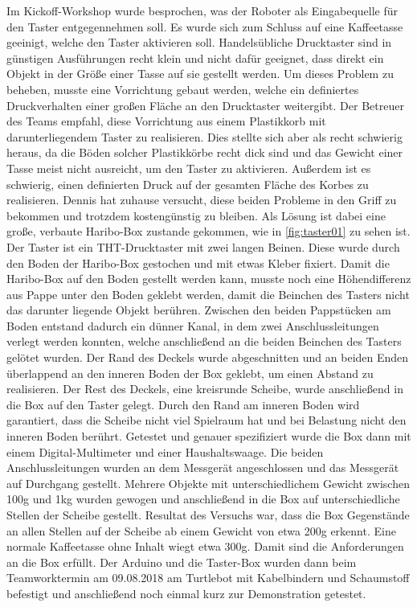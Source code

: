 \documentclass[a4paper,12pt,headsepline]{scrartcl}
\begin{document}
Im Kickoff-Workshop wurde besprochen, was der Roboter als Eingabequelle für den Taster entgegennehmen soll. Es wurde sich zum Schluss auf eine Kaffeetasse geeinigt, welche den Taster aktivieren soll. Handelsübliche Drucktaster sind in günstigen Ausführungen recht klein und nicht dafür geeignet, dass direkt ein Objekt in der Größe einer Tasse auf sie gestellt werden. Um dieses Problem zu beheben, musste eine Vorrichtung gebaut werden, welche ein definiertes Druckverhalten einer großen Fläche an den Drucktaster weitergibt. Der Betreuer des Teams empfahl, diese Vorrichtung aus einem Plastikkorb mit darunterliegendem Taster zu realisieren. Dies stellte sich aber als recht schwierig heraus, da die Böden solcher Plastikkörbe recht dick sind und das Gewicht einer Tasse meist nicht ausreicht, um den Taster zu aktivieren. Außerdem ist es schwierig, einen definierten Druck auf der gesamten Fläche des Korbes zu realisieren. Dennis hat zuhause versucht, diese beiden Probleme in den Griff zu bekommen und trotzdem kostengünstig zu bleiben. Als Lösung ist dabei eine große, verbaute Haribo-Box zustande gekommen, wie in \cref{fig:taster01} zu sehen ist. Der Taster ist ein THT-Drucktaster mit zwei langen Beinen. Diese wurde durch den Boden der Haribo-Box gestochen und mit etwas Kleber fixiert. Damit die Haribo-Box auf den Boden gestellt werden kann, musste noch eine Höhendifferenz aus Pappe unter den Boden geklebt werden, damit die Beinchen des Tasters nicht das darunter liegende Objekt berühren. Zwischen den beiden Pappstücken am Boden entstand dadurch ein dünner Kanal, in dem zwei Anschlussleitungen verlegt werden konnten, welche anschließend an die beiden Beinchen des Tasters gelötet wurden. Der Rand des Deckels wurde abgeschnitten und an beiden Enden überlappend an den inneren Boden der Box geklebt, um einen Abstand zu realisieren. Der Rest des Deckels, eine kreisrunde Scheibe, wurde anschließend in die Box auf den Taster gelegt. Durch den Rand am inneren Boden wird garantiert, dass die Scheibe nicht viel Spielraum hat und bei Belastung nicht den inneren Boden berührt. Getestet und genauer spezifiziert wurde die Box dann mit einem Digital-Multimeter und einer Haushaltswaage. Die beiden Anschlussleitungen wurden an dem Messgerät angeschlossen und das Messgerät auf Durchgang gestellt. Mehrere Objekte mit unterschiedlichem Gewicht zwischen 100g und 1kg wurden gewogen und anschließend in die Box auf unterschiedliche Stellen der Scheibe gestellt. Resultat des Versuchs war, dass die Box Gegenstände an allen Stellen auf der Scheibe ab einem Gewicht von etwa 200g erkennt. Eine normale Kaffeetasse ohne Inhalt wiegt etwa 300g. Damit sind die Anforderungen an die Box erfüllt. Der Arduino und die Taster-Box wurden dann beim Teamworktermin am 09.08.2018 am Turtlebot mit Kabelbindern und Schaumstoff befestigt und anschließend noch einmal kurz zur Demonstration getestet.
\end{document}
